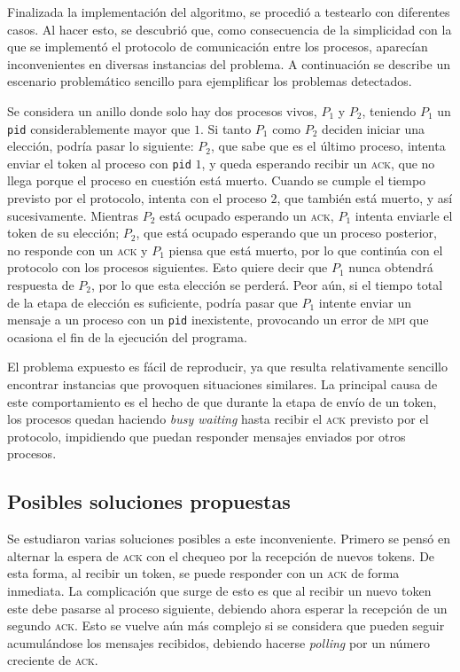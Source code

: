 \documentclass[a4paper]{article}
\newcommand{\acr}[1]{\textsc{\lowercase{#1}}}
\begin{document}
Finalizada la implementación del algoritmo, se procedió a testearlo con
diferentes casos. Al hacer esto, se descubrió que, como consecuencia de la
simplicidad con la que se implementó el protocolo de comunicación entre los
procesos, aparecían inconvenientes en diversas instancias del problema. A
continuación se describe un escenario problemático sencillo para ejemplificar
los problemas detectados.

Se considera un anillo donde solo hay dos procesos vivos, $P_1$ y $P_2$,
teniendo $P_1$ un \texttt{pid} considerablemente mayor que $1$. Si tanto $P_1$
como $P_2$ deciden iniciar una elección, podría pasar lo siguiente: $P_2$, que
sabe que es el último proceso, intenta enviar el token al proceso con
\texttt{pid} $1$, y queda esperando recibir un \acr{ACK}, que no llega porque
el proceso en cuestión está muerto. Cuando se cumple el tiempo previsto por el
protocolo, intenta con el proceso $2$, que también está muerto, y así
sucesivamente. Mientras $P_2$ está ocupado esperando un \acr{ACK}, $P_1$
intenta enviarle el token de su elección; $P_2$, que está ocupado esperando
que un proceso posterior, no responde con un \acr{ACK} y $P_1$ piensa que está
muerto, por lo que continúa con el protocolo con los procesos siguientes. Esto
quiere decir que $P_1$ nunca obtendrá respuesta de $P_2$, por lo que esta
elección se perderá. Peor aún, si el tiempo total de la etapa de elección es
suficiente, podría pasar que $P_1$ intente enviar un mensaje a un proceso con
un \texttt{pid} inexistente, provocando un error de \acr{MPI} que ocasiona el
fin de la ejecución del programa.

El problema expuesto es fácil de reproducir, ya que resulta relativamente
sencillo encontrar instancias que provoquen situaciones similares. La
principal causa de este comportamiento es el hecho de que durante la etapa de
envío de un token, los procesos quedan haciendo \emph{busy waiting} hasta
recibir el \acr{ACK} previsto por el protocolo, impidiendo que puedan
responder mensajes enviados por otros procesos.

\subsection{Posibles soluciones propuestas}

Se estudiaron varias soluciones posibles a este inconveniente. Primero se
pensó en alternar la espera de \acr{ACK} con el chequeo por la recepción de
nuevos tokens. De esta forma, al recibir un token, se puede responder con un
\acr{ACK} de forma inmediata. La complicación que surge de esto es que al
recibir un nuevo token este debe pasarse al proceso siguiente, debiendo
ahora esperar la recepción de un segundo \acr{ACK}. Esto se vuelve aún más
complejo si se considera que pueden seguir acumulándose los mensajes
recibidos, debiendo hacerse \emph{polling} por un número creciente de \acr
{ACK}.
\end{document}
